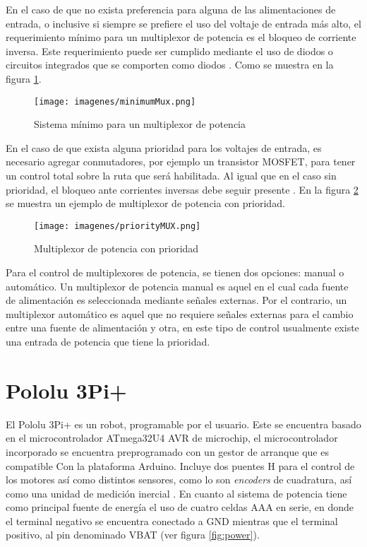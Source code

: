 En el caso de que no exista preferencia para alguna de las alimentaciones de entrada, o inclusive
si siempre se prefiere el uso del voltaje de entrada más alto, el requerimiento mínimo para un multiplexor
de potencia es el bloqueo de corriente inversa. Este requerimiento puede ser cumplido mediante el uso de 
diodos o circuitos integrados que se comporten como diodos \cite{triano_basics_2020}.  Como se muestra en la figura \ref{fig:muxDiode}.

\begin{figure}[H]
    \centering
    \texttt{[image: imagenes/minimumMux.png]}
    \caption{Sistema mínimo para un multiplexor de potencia \cite{triano_basics_2020}}
    \label{fig:muxDiode}
\end{figure}

En el caso de que exista alguna prioridad para los voltajes de entrada, es necesario agregar conmutadores,
por ejemplo un transistor MOSFET, para tener un control total sobre la ruta que será habilitada. Al igual que
en el caso sin prioridad, el bloqueo ante corrientes inversas debe seguir presente \cite{triano_basics_2020}. En la figura \ref{fig:priorityMux} se muestra un ejemplo de multiplexor de potencia con prioridad.

\begin{figure}[H]
    \centering
    \texttt{[image: imagenes/priorityMUX.png]}
    \caption{Multiplexor de potencia con prioridad \cite{triano_basics_2020}}
    \label{fig:priorityMux}
\end{figure}

Para el control de multiplexores de potencia, se tienen dos opciones: manual o automático. Un multiplexor de
potencia manual es aquel en el cual cada fuente de alimentación es seleccionada mediante señales externas. Por el contrario, un multiplexor automático es aquel que no requiere señales externas para el cambio entre 
una fuente de alimentación y otra, en este tipo de control usualmente existe una entrada de potencia que 
tiene la prioridad.

\section{Pololu 3Pi+}

El Pololu 3Pi+ es un robot, programable por el usuario. Este se encuentra basado en el microcontrolador ATmega32U4 AVR
de microchip, el microcontrolador incorporado se encuentra preprogramado con un gestor de arranque que es compatible
 Con la plataforma Arduino. Incluye dos puentes H para el control de los motores así como distintos sensores, como lo 
 son \textit{encoders} de cuadratura, así como una unidad de medición inercial \cite{noauthor_pololu_nodate}. En cuanto 
 al sistema de potencia tiene como principal fuente de energía el uso de cuatro celdas AAA en serie, en donde el 
 terminal negativo se encuentra conectado a GND mientras que el terminal positivo, al pin denominado VBAT (ver figura
 \ref{fig:power}).

